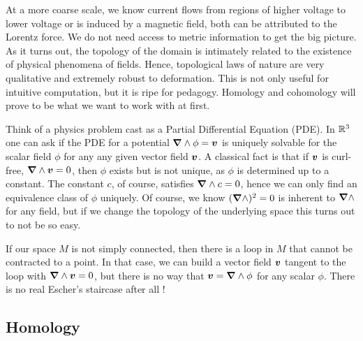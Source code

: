\documentclass{article}
\begin{document}
At a more coarse scale, we know current flows from regions of higher voltage to lower voltage or is induced by a magnetic field, both can be attributed to the Lorentz force. We do not need access to metric information to get the big picture. As it turns out, the topology of the domain is intimately related to the existence of physical phenomena of fields. Hence, topological laws of nature are very qualitative and extremely robust to deformation. This is not only useful for intuitive computation, but it is ripe for pedagogy. Homology and cohomology will prove to be what we want to work with at first.

Think of a physics problem cast as a Partial Differential Equation (PDE). In $\mathbb{R}^3$ one can ask if the PDE for a potential $\boldsymbol{\nabla} \wedge \phi = \boldsymbol{v}$ is uniquely solvable for the scalar field $\phi$ for any any given vector field $\boldsymbol{v}$. A classical fact is that if $\boldsymbol{v}$ is curl-free, $\boldsymbol{\nabla} \wedge \boldsymbol{v}=0$, then $\phi$ exists but is not unique, as $\phi$ is determined up to a constant. The constant $c$, of course, satisfies $\boldsymbol{\nabla} \wedge c=0$, hence we can only find an equivalence class of $\phi$ uniquely. Of course, we know $(\boldsymbol{\nabla} \wedge)^2  =0$ is inherent to $\boldsymbol{\nabla} \wedge$ for any field, but if we change the topology of the underlying space this turns out to not be so easy.

If our space $M$ is not simply connected, then there is a loop in $M$ that cannot be contracted to a point. In that case, we can build a vector field $\boldsymbol{v}$ tangent to the loop with $\boldsymbol{\nabla} \wedge \boldsymbol{v}=0$, but there is no way that $\boldsymbol{v}=\boldsymbol{\nabla} \wedge \phi$ for any scalar $\phi$. There is no real Escher's staircase after all ! 


\subsection{Homology}
\label{subsec:homology}
\end{document}
